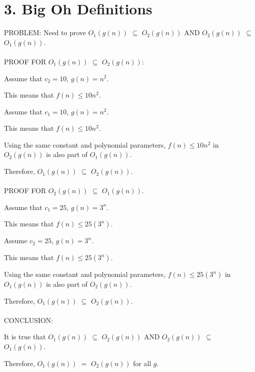 \documentclass[11pt]{article}
\begin{document}
\newpage
\section*{3. Big Oh Definitions}
PROBLEM: Need to prove $O_{1}(g(n))$ $\subseteq $ $O_{2}(g(n))$ AND $O_{2}(g(n))$ $\subseteq $ $O_{1}(g(n))$. \\ 
\\
PROOF FOR $O_{1}(g(n))$ $\subseteq $ $O_{2}(g(n))$: 

Assume that $c_2 = 10$, $g(n) = n^2$. 

This means that $f(n) \leq 10n^2$. 

Assume that $c_1 = 10$, $g(n) = n^2$. 

This means that $f(n) \leq 10n^2$. 

Using the same constant and polynomial parameters, $f(n) \leq 10n^2$ in $O_{2}(g(n))$ is also part of $O_{1}(g(n))$. 

Therefore, $O_{1}(g(n))$ $\subseteq $ $O_{2}(g(n))$. \\
\\
PROOF FOR $O_{2}(g(n))$ $\subseteq $ $O_{1}(g(n))$. 

Assume that $c_1 = 25$, $g(n) = 3^n$. 

This means that $f(n) \leq 25(3^n)$. 

Assume $c_2 = 25$, $g(n) = 3^n$. 

This means that $f(n) \leq 25(3^n)$. 

Using the same constant and polynomial parameters, $f(n) \leq 25(3^n)$ in $O_{1}(g(n))$ is also part of $O_{2}(g(n))$. 

Therefore, $O_{1}(g(n))$ $\subseteq $ $O_{2}(g(n))$.\\
\\ 
CONCLUSION: 

It is true that $O_{1}(g(n))$ $\subseteq $ $O_{2}(g(n))$ AND $O_{2}(g(n))$ $\subseteq $ $O_{1}(g(n))$. 

Therefore, $O_{1}(g(n))$ $=$ $O_{2}(g(n))$ for all $g$.

\newpage
\end{document}
